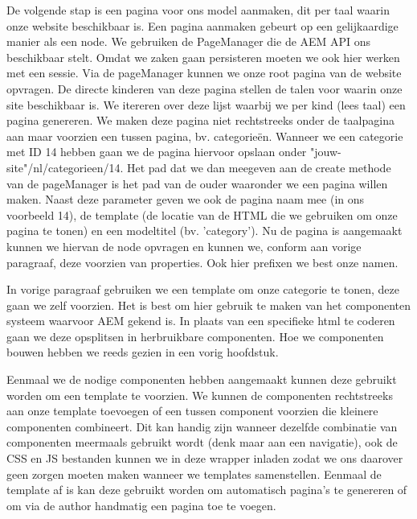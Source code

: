 \documentclass{article}
\begin{document}
	De volgende stap is een pagina voor ons model aanmaken, dit per taal waarin onze website beschikbaar is. Een pagina aanmaken gebeurt op een gelijkaardige manier als een node. We gebruiken de PageManager die de AEM API ons beschikbaar stelt. Omdat we zaken gaan persisteren moeten we ook hier werken met een sessie. Via de pageManager kunnen we onze root pagina van de website opvragen. De directe kinderen van deze pagina stellen de talen voor waarin onze site beschikbaar is. We itereren over deze lijst waarbij we per kind (lees taal) een pagina genereren. We maken deze pagina niet rechtstreeks onder de taalpagina aan maar voorzien een tussen pagina, bv. categorie\"en. Wanneer we een categorie met ID 14 hebben gaan we de pagina hiervoor opslaan onder "jouw-site"/nl/categorieen/14. Het pad dat we dan meegeven aan de create methode van de pageManager is het pad van de ouder waaronder we een pagina willen maken. Naast deze parameter geven we ook de pagina naam mee (in ons voorbeeld 14), de template (de locatie van de HTML die we gebruiken om onze pagina te tonen) en een modeltitel (bv. 'category'). Nu de pagina is aangemaakt kunnen we hiervan de node opvragen en kunnen we, conform aan vorige paragraaf, deze voorzien van properties. Ook hier prefixen we best onze namen.
    \par
    In vorige paragraaf gebruiken we een template om onze categorie te tonen, deze gaan we zelf voorzien. Het is best om hier gebruik te maken van het componenten systeem waarvoor AEM gekend is. In plaats van een specifieke html te coderen gaan we deze opsplitsen in herbruikbare componenten. Hoe we componenten bouwen hebben we reeds gezien in een vorig hoofdstuk.
    \par
    Eenmaal we de nodige componenten hebben aangemaakt kunnen deze gebruikt worden om een template te voorzien. We kunnen de componenten rechtstreeks aan onze template toevoegen of een tussen component voorzien die kleinere componenten combineert. Dit kan handig zijn wanneer dezelfde combinatie van componenten meermaals gebruikt wordt (denk maar aan een navigatie), ook de CSS en JS bestanden kunnen we in deze wrapper inladen zodat we ons daarover geen zorgen moeten maken wanneer we templates samenstellen. Eenmaal de template af is kan deze gebruikt worden om automatisch pagina's te genereren of om via de author handmatig een pagina toe te voegen.
\end{document}
